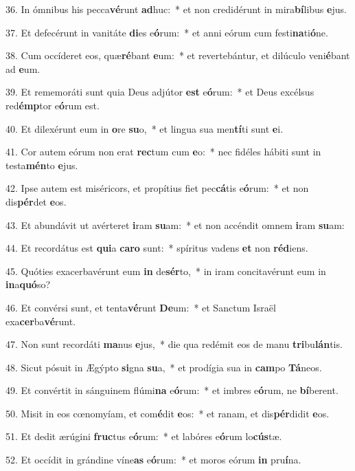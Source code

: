 36. In ómnibus his pecca\textbf{vé}runt \textbf{ad}huc:~*  et non credidérunt in mira\textbf{bí}libus \textbf{e}jus.\

37. Et defecérunt in vanitáte \textbf{di}es e\textbf{ó}rum:~*  et anni eórum cum festi\textbf{na}ti\textbf{ó}ne.\

38. Cum occíderet eos, quæ\textbf{ré}bant \textbf{e}um:~*  et revertebántur, et dilúculo veni\textbf{é}bant ad \textbf{e}um.\

39. Et rememoráti sunt quia Deus adjútor \textbf{est} e\textbf{ó}rum:~*  et Deus excélsus red\textbf{émp}tor e\textbf{ó}rum est.\

40. Et dilexérunt eum in \textbf{o}re \textbf{su}o,~*  et lingua sua men\textbf{tí}ti sunt \textbf{e}i.\

41. Cor autem eórum non erat \textbf{rec}tum cum \textbf{e}o:~*  nec fidéles hábiti sunt in testa\textbf{mén}to \textbf{e}jus.\

42. Ipse autem est miséricors, et propítius fiet pec\textbf{cá}tis e\textbf{ó}rum:~*  et non dis\textbf{pér}det \textbf{e}os.\

43. Et abundávit ut avérteret \textbf{i}ram \textbf{su}am:~*  et non accéndit omnem \textbf{i}ram \textbf{su}am:\

44. Et recordátus est \textbf{qui}a \textbf{ca}\textbf{ro} sunt:~*  spíritus vadens \textbf{et} non \textbf{réd}iens.\

45. Quóties exacerbavérunt eum \textbf{in} de\textbf{sér}to,~*  in iram concitavérunt eum in \textbf{in}a\textbf{quó}so?\

46. Et convérsi sunt, et tenta\textbf{vé}runt \textbf{De}um:~*  et Sanctum Israël exa\textbf{cer}ba\textbf{vé}runt.\

47. Non sunt recordáti \textbf{ma}nus \textbf{e}jus,~*  die qua redémit eos de manu \textbf{tri}bu\textbf{lán}tis.\

48. Sicut pósuit in Ægýpto \textbf{si}gna \textbf{su}a,~*  et prodígia sua in \textbf{cam}po \textbf{Tá}neos.\

49. Et convértit in sánguinem flúmi\textbf{na} e\textbf{ó}rum:~*  et imbres e\textbf{ó}rum, ne \textbf{bí}berent.\

50. Misit in eos cœnomyíam, et com\textbf{é}dit \textbf{e}os:~*  et ranam, et dis\textbf{pér}didit \textbf{e}os.\

51. Et dedit ærúgini \textbf{fruc}tus e\textbf{ó}rum:~*  et labóres e\textbf{ó}rum lo\textbf{cús}tæ.\

52. Et occídit in grándine víne\textbf{as} e\textbf{ó}rum:~*  et moros eórum \textbf{in} pru\textbf{í}na.\

